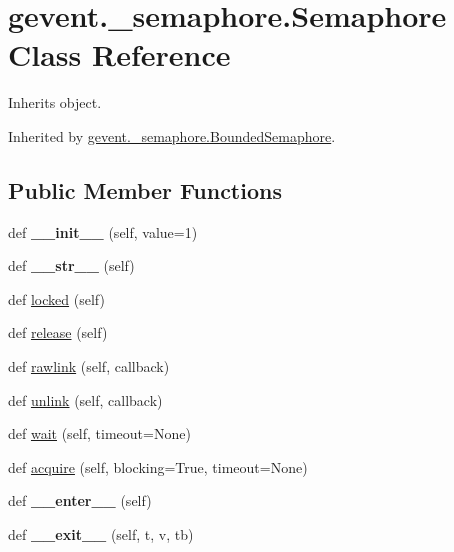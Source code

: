 \hypertarget{classgevent_1_1__semaphore_1_1_semaphore}{}\section{gevent.\+\_\+semaphore.\+Semaphore Class Reference}
\label{classgevent_1_1__semaphore_1_1_semaphore}


Inherits object.



Inherited by \hyperlink{classgevent_1_1__semaphore_1_1_bounded_semaphore}{gevent.\+\_\+semaphore.\+Bounded\+Semaphore}.

\subsection*{Public Member Functions}
\begin{DoxyCompactItemize}
\item 
\mbox{\label{classgevent_1_1__semaphore_1_1_semaphore_af5edcc550a2da8137efdb203e5eec39e}} 
def {\bfseries \+\_\+\+\_\+init\+\_\+\+\_\+} (self, value=1)
\item 
\mbox{\label{classgevent_1_1__semaphore_1_1_semaphore_a101da910442ed07a93c0d09073ab0681}} 
def {\bfseries \+\_\+\+\_\+str\+\_\+\+\_\+} (self)
\item 
def \hyperlink{classgevent_1_1__semaphore_1_1_semaphore_a3d8aae11706959b43e675d25bb587ad3}{locked} (self)
\item 
def \hyperlink{classgevent_1_1__semaphore_1_1_semaphore_a2ab3e1fb465052beb0665375bcaebc7e}{release} (self)
\item 
def \hyperlink{classgevent_1_1__semaphore_1_1_semaphore_a000832ddde5e835f5585ee3ca9327f34}{rawlink} (self, callback)
\item 
def \hyperlink{classgevent_1_1__semaphore_1_1_semaphore_a39e5f5a6a79ce124d551b7ee76670d52}{unlink} (self, callback)
\item 
def \hyperlink{classgevent_1_1__semaphore_1_1_semaphore_a8827acbc1a049a86b7334a7361e201ba}{wait} (self, timeout=None)
\item 
def \hyperlink{classgevent_1_1__semaphore_1_1_semaphore_a656f8277b06803a835ea1c59acc8d069}{acquire} (self, blocking=True, timeout=None)
\item 
\mbox{\label{classgevent_1_1__semaphore_1_1_semaphore_ad93963fef0e40a66d5d3b904a61fe001}} 
def {\bfseries \+\_\+\+\_\+enter\+\_\+\+\_\+} (self)
\item 
\mbox{\label{classgevent_1_1__semaphore_1_1_semaphore_ad0288926d89446f4c1e92329deaa24c1}} 
def {\bfseries \+\_\+\+\_\+exit\+\_\+\+\_\+} (self, t, v, tb)
\end{DoxyCompactItemize}

